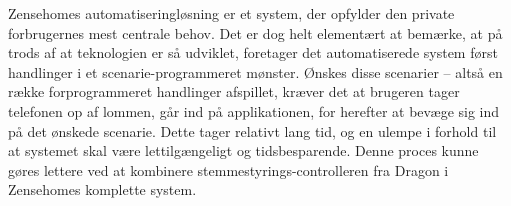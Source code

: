 Zensehomes automatiseringløsning er et system, der opfylder den private forbrugernes mest centrale behov. Det er dog helt elementært at bemærke, at på trods af at teknologien er så udviklet, foretager det automatiserede system først handlinger i et scenarie-programmeret mønster. Ønskes disse scenarier – altså en række forprogrammeret handlinger afspillet, kræver det at brugeren tager telefonen op af lommen, går ind på applikationen, for herefter at bevæge sig ind på det ønskede scenarie. Dette tager relativt lang tid, og en ulempe i forhold til at systemet skal være lettilgængeligt og tidsbesparende. Denne proces kunne gøres lettere ved at kombinere stemmestyrings-controlleren fra Dragon i Zensehomes komplette system.